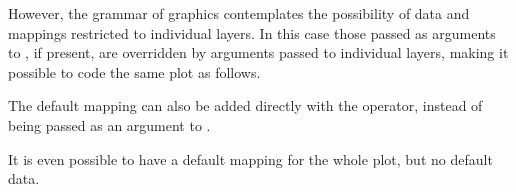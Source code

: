 \documentclass[krantz2]{krantz}\usepackage{knitr}
\begin{document}
\begin{knitrout}\footnotesize
{}\color{fgcolor}\begin{kframe}
\begin{alltt}
\hlstd{(} 
        \hlstd{=} \hlstd{(}    \hlopt{+}
  \hlstd{()}
\end{alltt}
\end{kframe}
\end{knitrout}

However, the grammar of graphics contemplates the possibility of data and mappings restricted to individual layers. In this case those passed as arguments to , if present,  are overridden by arguments passed to individual layers, making it possible to code the same plot as follows.

\begin{knitrout}\footnotesize
{}\color{fgcolor}\begin{kframe}
\begin{alltt}
\hlstd{()} \hlopt{+}
  \hlstd{(} 
              \hlstd{=} \hlstd{(}   
\end{alltt}
\end{kframe}
\end{knitrout}

The default mapping can also be added directly with the \code{+} operator, instead of being passed as an argument to .

\begin{knitrout}\footnotesize
{}\color{fgcolor}\begin{kframe}
\begin{alltt}
\hlstd{(}  \hlopt{+}
  \hlstd{(}    \hlopt{+}
  \hlstd{()}
\end{alltt}
\end{kframe}
\end{knitrout}

It is even possible to have a default mapping for the whole plot, but no default data.

\begin{knitrout}\footnotesize
{}\color{fgcolor}\begin{kframe}
\begin{alltt}
\hlstd{()} \hlopt{+}
  \hlstd{(}    \hlopt{+}
  \hlstd{(} 
\end{alltt}
\end{kframe}
\end{knitrout}
\end{document}
